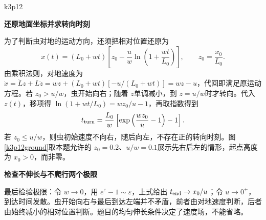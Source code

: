 \begin{drillsolution}{k3p12}


\par\medskip{}\noindent\textbf{还原地面坐标并求转向时刻}\par\nobreak
为了判断虫对地的运动方向，还须把相对位置还原为
\[x(t)=(L_0+wt)\left[z_0-\frac uw
                  \ln\left(1+\frac{wt}{L_0}\right)\right],
 \qquad z_0=\frac{x_0}{L_0}.\]
由乘积法则，对地速度为 $\dot x=\dot Lz+L\dot z=wz+(L_0+wt)[-u/(L_0+wt)]=wz-u$，代回即满足原运动方程。若 $z_0>u/w$，虫开始向右；随着 $z$单调减小，到 $z=u/w$时才转向。代入 $z(t)$，移项得 $\ln(1+wt/L_0)=wz_0/u-1$，再取指数得到
\[t_{\rm turn}=\frac{L_0}{w}
       \left[\exp\left(\frac{wz_0}{u}-1\right)-1\right].\]
若 $z_0\le u/w$，则虫初始速度不向右，随后向左，不存在正的转向时刻。图\ref{k3p12ground}取本题允许的 $z_0=0.2$、$u/w=0.1$展示先右后左的情形，起点高度为 $x_0>0$，而非零。


\par\medskip{}\noindent\textbf{检查不伸长与不爬行两个极限}\par\nobreak
最后检验极限：令 $w\to0$，用 $e^\varepsilon-1\sim\varepsilon$，上式给出 $t_{\rm end}\to x_0/u$；令 $u\to0^+$，到达时间发散。虫开始向右与最后到达左端并不矛盾，前者由对地速度判断，后者由始终减小的相对位置判断。题目的均匀伸长条件决定了速度场，不能省略。\end{drillsolution}
